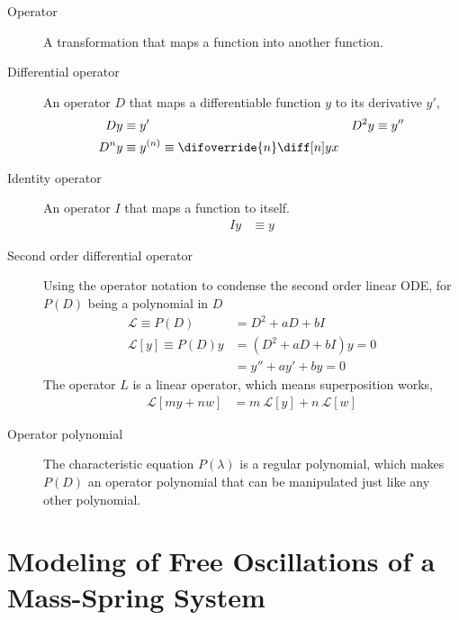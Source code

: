 \begin{description}
    \item[Operator] A transformation that maps a function into another function.
    \item[Differential operator] An operator $ D $ that maps a differentiable function $ y $ to
        its derivative $ y' $,
        \begin{align}
            Dy     & \equiv y'                                         & D^{2}y & \equiv y'' \\
            D^{n}y & \equiv y^{(n)} \equiv \difoverride{n} \diff[n] yx
        \end{align}
    \item[Identity operator] An operator $ I $ that maps a function to itself.
        \begin{align}
            Iy & \equiv y
        \end{align}
    \item[Second order differential operator] Using the operator notation to condense the
        second order linear ODE, for $ P(D) $ being a polynomial in $ D $
        \begin{align}
            \mathcal{L} \equiv P(D)    & = D^{2} + aD + bI        \\
            \mathcal{L}[y]\equiv P(D)y & = (D^{2} + aD + bI)y = 0 \\
                                       & = y'' + ay' + by = 0
        \end{align}
        The operator $ L $ is a linear operator, which means superposition works,
        \begin{align}
            \mathcal{L}[my + nw] & = m\ \mathcal{L}[y]+ n\ \mathcal{L}[w]
        \end{align}
    \item[Operator polynomial] The characteristic equation $ P(\lambda) $ is a regular
        polynomial, which makes $ P(D) $ an operator polynomial that can be manipulated
        just like any other polynomial.
\end{description}

\section{Modeling of Free Oscillations of a Mass-Spring System}

